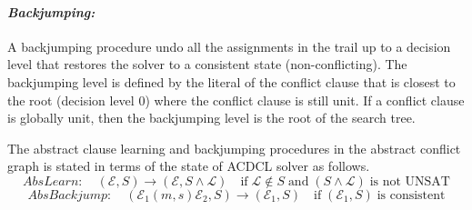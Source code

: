 \paragraph {\em Backjumping:}
A backjumping procedure undo all the assignments in the trail up to 
a decision level that restores the solver to a consistent state 
(non-conflicting).  The backjumping level is defined by the literal 
of the conflict clause that is closest to the root (decision level 0) 
where the conflict clause is still unit. If a conflict clause is 
globally unit, then the backjumping level is the root of the search tree.

The abstract clause learning and backjumping procedures in the abstract 
conflict graph is stated in terms of the state of ACDCL solver as follows. 
\[AbsLearn: \quad  (\mathcal{E},S) \rightarrow (\mathcal{E},S \wedge
\mathcal{L}) \quad \text{if} \; \mathcal{L} \notin S \; \textrm{and}
\; (S \wedge \mathcal{L}) \; \text{is not UNSAT} \]
\[AbsBackjump: \quad (\mathcal{E}_1(m,s)\mathcal{E}_2,S) \rightarrow
(\mathcal{E}_1,S) \quad \text{if} \; (\mathcal{E}_1,S) \; \text{is
consistent} \]   
  

